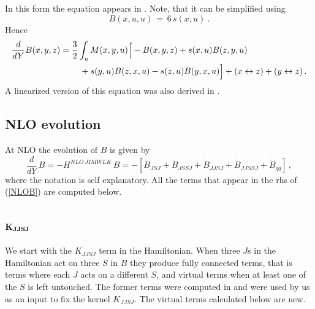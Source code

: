 \documentclass[11pt,a4paper]{article}
\def\beq{\begin{equation}}
\def\eeq{\end{equation}}
\def\beq{\begin{equation}}
\def\eeq{\end{equation}}
\begin{document}
In this form the equation appears in \cite{Grab,GrabLO}.  Note, that it can be simplified using
\beq
B(x,u,u)\,=\,6\,s(x,u)\ .
\eeq
Hence
\begin{equation}\begin{split}
&{d\over dY} B(x,y,z)={3\over 2} \int_{u}M(x,y,u)\Big[-B(x,y,z)+s(x,u)B(z,y,u)\\ 
&\ \ \ \ \ \ \ \ \ \ \ \ \ \ \ \ \ \ \ \ \ \ \ \ + s(y,u)B(z,x,u)-s(z,u)B(y,x,u)\Big]+(x\leftrightarrow z) +(y\leftrightarrow z)\,.\\
 \end{split}\end{equation}
A linearized version of this equation was also derived in \cite{Hattaoderon}.
  
\subsection{NLO evolution}
  At NLO the evolution of $B$ is given by 
\beq\label{NLOB}
\frac{d}{dY}\,B=-H^{NLO\,JIMWLK}\,B= -\left[\dot B_{JSJ} +\dot B_{JSSJ}+\dot B_{JJSJ}+\dot B_{JJSSJ}+\dot B_{qq}\right]\,,
\eeq
where the notation is self explanatory.
All the terms that appear in the rhs of (\ref{NLOB}) are computed below.

 \subsection*{$\bf K_{JJSJ}$}
 
We start with the $K_{JJSJ}$ term in the Hamiltonian. When three $J$s in the Hamiltonian act on three $S$ in $B$ they  produce fully connected terms, that
is terms where each $J$ acts on a different $S$,  and virtual terms when at least one of the $S$ is left untouched. The former  terms were computed in \cite{Grab} 
and were used by us as an input to fix the kernel $K_{JJSJ}$. The virtual terms calculated below are new.
\end{document}
